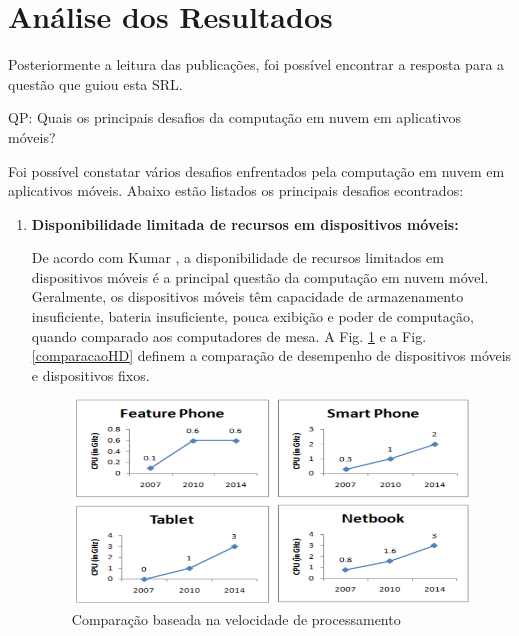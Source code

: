 \documentclass[12pt]{article}
\begin{document}
\section{Análise dos Resultados}

Posteriormente a leitura das publicações, foi possível encontrar a resposta para a questão que guiou esta SRL.

QP: Quais os principais desafios da computação em nuvem em aplicativos móveis?

Foi possível constatar vários desafios enfrentados pela computação em nuvem em aplicativos móveis. Abaixo estão listados os
principais desafios econtrados:

\begin{enumerate}
  \item \textbf{Disponibilidade limitada de recursos em dispositivos móveis:}
  
  De acordo com Kumar \cite{kumar2014}, a disponibilidade de recursos limitados em dispositivos móveis é a principal questão da 
  computação em nuvem móvel. Geralmente, os dispositivos móveis têm capacidade de armazenamento insuficiente, 
  bateria insuficiente, pouca exibição e poder de computação, quando comparado aos computadores de mesa.
  A Fig. \ref{comparacaoCPU} e a Fig. \ref{comparacaoHD} definem a comparação de desempenho de dispositivos móveis e dispositivos fixos.
  
  \begin{figure}[ht]
    \centering
    \includegraphics[scale= 0.4]{figuras/comparacao_cpu.png}
    \caption{Comparação baseada na velocidade de processamento}
    \label{comparacaoCPU}
  \end{figure}
  

\end{enumerate}
\end{document}
